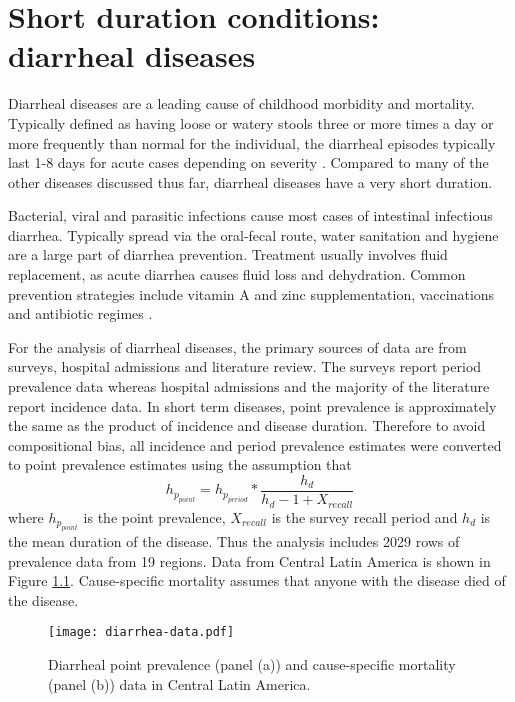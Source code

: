 \chapter{Short duration conditions: diarrheal diseases}
\label{applications-short_dur}

Diarrheal diseases are a leading cause of childhood morbidity and mortality.  Typically defined as having loose or watery stools three or more times a day or more frequently than normal for the individual, the diarrheal episodes typically last 1-8 days for acute cases depending on severity \cite{unicef_diarrhoea_2009, carlos_etiology_1990, lamberti_systematic_2012}.  Compared to many of the other diseases discussed thus far, diarrheal diseases have a very short duration.

Bacterial, viral and parasitic infections cause most cases of intestinal infectious diarrhea.  Typically spread via the oral-fecal route, water sanitation and hygiene are a large part of diarrhea prevention.  Treatment usually involves fluid replacement, as acute diarrhea causes fluid loss and dehydration.  Common prevention strategies include vitamin A and zinc supplementation, vaccinations and antibiotic regimes \cite{unicef_diarrhoea_2009, carlos_etiology_1990, lamberti_systematic_2012}.

For the analysis of diarrheal diseases, the primary sources of data are from surveys, hospital admissions and literature review.  The surveys report period prevalence data whereas hospital admissions and the majority of the literature report incidence data.  In short term diseases, point prevalence is approximately the same as the product of incidence and disease duration.  Therefore to avoid compositional bias, all incidence and period prevalence estimates were converted to point prevalence estimates using the assumption that
    \begin{equation}
    	h_{p_{point}}=h_{p_{period}} * \frac{h_{d}}{h_{d}-1+X_{recall}}
    \end{equation}
where $h_{p_{point}}$ is the point prevalence, $X_{recall}$ is the survey recall period and $h_{d}$ is the mean duration of the disease.  Thus the analysis includes 2029 rows of prevalence data from 19 regions.  Data from Central Latin America is shown in Figure \ref{fig:app-diarrhea data}.  Cause-specific mortality assumes that anyone with the disease died of the disease.

    \begin{figure}[h]
        \begin{center}
            \texttt{[image: diarrhea-data.pdf]}
            \caption{Diarrheal point prevalence (panel (a)) and cause-specific mortality (panel (b)) data in Central Latin America.}
            \label{fig:app-diarrhea data}
        \end{center}
    \end{figure}

